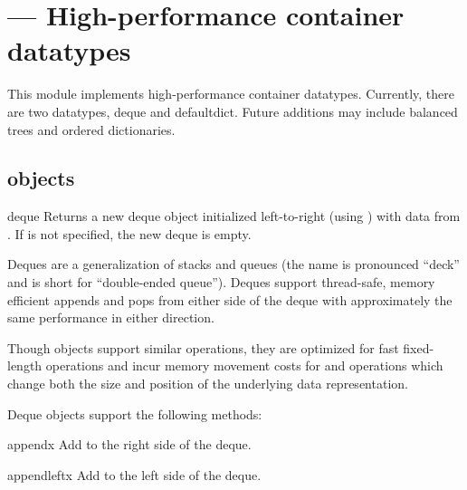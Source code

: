 \section{ ---
         High-performance container datatypes}



This module implements high-performance container datatypes.  Currently,
there are two datatypes, deque and defaultdict.
Future additions may include balanced trees and ordered dictionaries.

\subsection{ objects \label{deque-objects}}

\begin{funcdesc}{deque}{}
  Returns a new deque object initialized left-to-right (using
  ) with data from .  If 
  is not specified, the new deque is empty.

  Deques are a generalization of stacks and queues (the name is pronounced
  ``deck'' and is short for ``double-ended queue'').  Deques support
  thread-safe, memory efficient appends and pops from either side of the deque
  with approximately the same  performance in either direction.

  Though  objects support similar operations, they are optimized
  for fast fixed-length operations and incur  memory movement costs
  for  and  operations which change both the
  size and position of the underlying data representation.
\end{funcdesc}

Deque objects support the following methods:

\begin{methoddesc}{append}{x}
   Add  to the right side of the deque.
\end{methoddesc}

\begin{methoddesc}{appendleft}{x}
   Add  to the left side of the deque.
\end{methoddesc}

